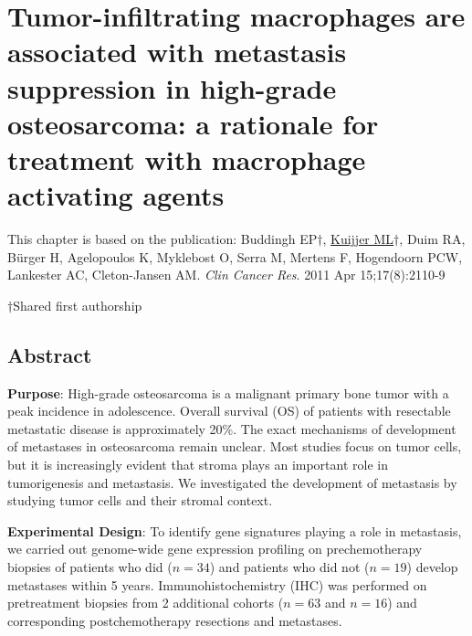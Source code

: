 

%


\chapter{Tumor\hyp{}infiltrating macrophages are associated with metastasis suppression in high\hyp{}grade osteosarcoma: a rationale for treatment with macrophage activating agents}\label{ch4}
\thispagestyle{empty}				%

\vfill

\vspace{0.5cm}
This chapter is based on the publication:
Buddingh EP$\dagger$, \underline{Kuijjer ML}$\dagger$, Duim RA, B{\"u}rger H, Agelopoulos K, Myklebost O, Serra M, Mertens F, Hogendoorn PCW, Lankester AC, Cleton-Jansen AM. {\it Clin Cancer Res}. 2011 Apr 15;17(8):2110-9
\begin{small}
$\dagger$Shared first authorship
\end{small}

\newpage


\section{Abstract}\label{abstract4}
\textbf{Purpose}: High-grade osteosarcoma is a malignant primary bone tumor with a peak incidence in adolescence. Overall survival (OS) of patients with resectable metastatic disease is approximately 20\%. The exact mechanisms of development of metastases in osteosarcoma remain unclear. Most studies focus on tumor cells, but it is increasingly evident that stroma plays an important role in tumorigenesis and metastasis. We investigated the development of metastasis by studying tumor cells and their stromal context.

\textbf{Experimental Design}: To identify gene signatures playing a role in metastasis, we carried out genome\hyp{}wide gene expression profiling on prechemotherapy biopsies of patients who did ($n=34$) and patients who did not ($n=19$) develop metastases within 5 years. Immunohistochemistry (IHC) was performed on pretreatment biopsies from 2 additional cohorts ($n=63$ and $n=16$) and corresponding postchemotherapy resections and metastases.

